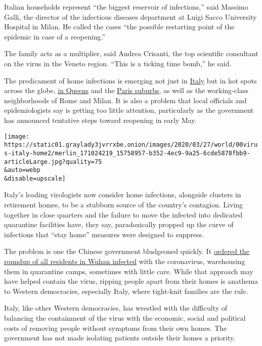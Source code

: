 Italian households represent ``the biggest reservoir of infections,''
said Massimo Galli, the director of the infectious diseases department
at Luigi Sacco University Hospital in Milan. He called the cases ``the
possible restarting point of the epidemic in case of a reopening.''

The family acts as a multiplier, said Andrea Crisanti, the top
scientific consultant on the virus in the Veneto region. ``This is a
ticking time bomb,'' he said.

The predicament of home infections is emerging not just in
\href{https://www.nytimes3xbfgragh.onion/2020/05/06/world/europe/italy-coronavirus-reopening-parents.html}{Italy}
but in hot spots across the globe,
\href{https://www.nytimes3xbfgragh.onion/2020/04/09/nyregion/coronavirus-queens-corona-jackson-heights-elmhurst.html}{in
Queens} and the
\href{https://www.nytimes3xbfgragh.onion/2020/04/10/world/europe/coronavirus-paris-suburbs.html}{Paris
suburbs}, as well as the working-class neighborhoods of Rome and Milan.
It is also a problem that local officials and epidemiologists say is
getting too little attention, particularly as the government has
announced tentative steps toward reopening in early May.

\texttt{[image: https://static01.graylady3jvrrxbe.onion/images/2020/03/27/world/00virus-italy-home2/merlin\_171024219\_15758957-b352-4ec9-9a25-6cde5878fbb9-articleLarge.jpg?quality=75\\\&auto=webp\\\&disable=upscale]}

Italy's leading virologists now consider home infections, alongside
clusters in retirement homes, to be a stubborn source of the country's
contagion. Living together in close quarters and the failure to move the
infected into dedicated quarantine facilities have, they say,
paradoxically propped up the curve of infections that ``stay home''
measures were designed to suppress.

The problem is one the Chinese government bludgeoned quickly. It
\href{https://www.nytimes3xbfgragh.onion/2020/02/06/world/asia/coronavirus-china.html?action=click\&module=RelatedLinks\&pgtype=Article}{ordered
the roundup of all residents in Wuhan infected} with the coronavirus,
warehousing them in quarantine camps, sometimes with little care. While
that approach may have helped contain the virus, ripping people apart
from their homes is anathema to Western democracies, especially Italy,
where tight-knit families are the rule.

Italy, like other Western democracies, has wrestled with the difficulty
of balancing the containment of the virus with the economic, social and
political costs of removing people without symptoms from their own
homes. The government has not made isolating patients outside their
homes a priority.

